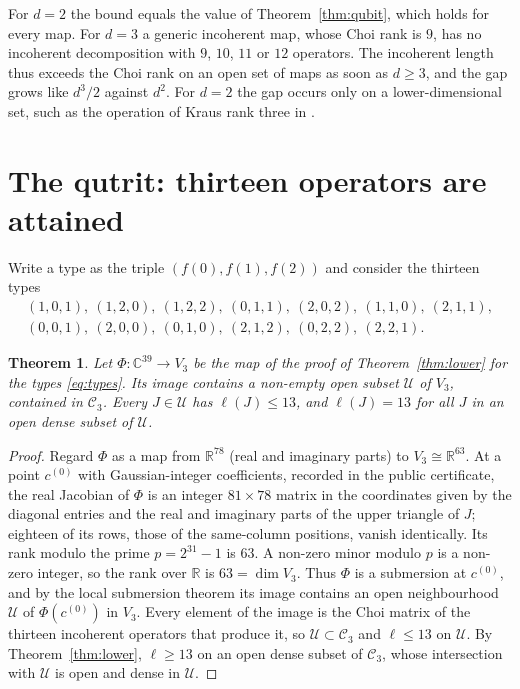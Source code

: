 \documentclass[11pt,a4paper]{article}
\newtheorem{theorem}{Theorem}
\theoremstyle{definition}
\theoremstyle{plain}
\newcommand{\C}{\mathbb{C}}
\newcommand{\R}{\mathbb{R}}
\begin{document}
For $d=2$ the bound equals the value of Theorem~\ref{thm:qubit}, which
holds for every map. For $d=3$ a generic incoherent map, whose Choi rank is
$9$, has no incoherent decomposition with $9$, $10$, $11$ or $12$
operators. The incoherent length thus exceeds the Choi rank on an open set
of maps as soon as $d\ge3$, and the gap grows like $d^3/2$ against $d^2$. For
$d=2$ the gap occurs only on a lower-dimensional set, such as the operation of
Kraus rank three in \cite[Prop.~6]{RanaLewenstein2018}.

\section{The qutrit: thirteen operators are attained}\label{sec:qutrit}
Write a type as the triple $(f(0),f(1),f(2))$ and consider the thirteen types
\begin{equation}\label{eq:types}
\begin{gathered}
(1,0,1),\ (1,2,0),\ (1,2,2),\ (0,1,1),\ (2,0,2),\ (1,1,0),\ (2,1,1),\\
(0,0,1),\ (2,0,0),\ (0,1,0),\ (2,1,2),\ (0,2,2),\ (2,2,1).
\end{gathered}
\end{equation}

\begin{theorem}\label{thm:qutrit}
Let $\Phi:\C^{39}\to V_3$ be the map of the proof of Theorem~\ref{thm:lower}
for the types \eqref{eq:types}. Its image contains a non-empty open subset
$\mathcal U$ of $V_3$, contained in $\mathcal C_3$. Every $J\in\mathcal U$
has $\ell(J)\le13$, and $\ell(J)=13$ for all $J$ in an open dense subset of
$\mathcal U$.
\end{theorem}
\begin{proof}
Regard $\Phi$ as a map from $\R^{78}$ (real and imaginary parts) to
$V_3\cong\R^{63}$. At a point $c^{(0)}$ with Gaussian-integer coefficients,
recorded in the public certificate, the real Jacobian of $\Phi$ is an integer
$81\times78$ matrix in the coordinates given by the diagonal entries and the
real and imaginary parts of the upper triangle of $J$; eighteen of its rows,
those of the same-column positions, vanish identically. Its rank modulo the
prime $p=2^{31}-1$ is $63$. A non-zero minor modulo $p$ is a non-zero
integer, so the rank over $\R$ is $63=\dim V_3$. Thus $\Phi$ is a submersion
at $c^{(0)}$, and by the local submersion theorem its image contains an open
neighbourhood $\mathcal U$ of $\Phi(c^{(0)})$ in $V_3$. Every element of the
image is the Choi matrix of the thirteen incoherent operators that produce
it, so $\mathcal U\subset\mathcal C_3$ and $\ell\le13$ on $\mathcal U$. By
Theorem~\ref{thm:lower}, $\ell\ge13$ on an open dense subset of
$\mathcal C_3$, whose intersection with $\mathcal U$ is open and dense in
$\mathcal U$.
\end{proof}
\end{document}
